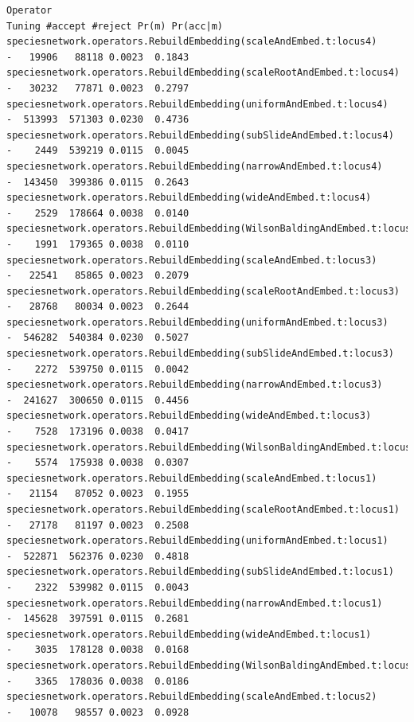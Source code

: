 \documentclass[11pt]{article}
\begin{document}
{\begin{verbatim}
Operator                                                                   Tuning #accept #reject Pr(m) Pr(acc|m)
speciesnetwork.operators.RebuildEmbedding(scaleAndEmbed.t:locus4)               -   19906   88118 0.0023  0.1843 
speciesnetwork.operators.RebuildEmbedding(scaleRootAndEmbed.t:locus4)           -   30232   77871 0.0023  0.2797 
speciesnetwork.operators.RebuildEmbedding(uniformAndEmbed.t:locus4)             -  513993  571303 0.0230  0.4736 
speciesnetwork.operators.RebuildEmbedding(subSlideAndEmbed.t:locus4)            -    2449  539219 0.0115  0.0045 
speciesnetwork.operators.RebuildEmbedding(narrowAndEmbed.t:locus4)              -  143450  399386 0.0115  0.2643 
speciesnetwork.operators.RebuildEmbedding(wideAndEmbed.t:locus4)                -    2529  178664 0.0038  0.0140 
speciesnetwork.operators.RebuildEmbedding(WilsonBaldingAndEmbed.t:locus4)       -    1991  179365 0.0038  0.0110 
speciesnetwork.operators.RebuildEmbedding(scaleAndEmbed.t:locus3)               -   22541   85865 0.0023  0.2079 
speciesnetwork.operators.RebuildEmbedding(scaleRootAndEmbed.t:locus3)           -   28768   80034 0.0023  0.2644 
speciesnetwork.operators.RebuildEmbedding(uniformAndEmbed.t:locus3)             -  546282  540384 0.0230  0.5027 
speciesnetwork.operators.RebuildEmbedding(subSlideAndEmbed.t:locus3)            -    2272  539750 0.0115  0.0042 
speciesnetwork.operators.RebuildEmbedding(narrowAndEmbed.t:locus3)              -  241627  300650 0.0115  0.4456 
speciesnetwork.operators.RebuildEmbedding(wideAndEmbed.t:locus3)                -    7528  173196 0.0038  0.0417 
speciesnetwork.operators.RebuildEmbedding(WilsonBaldingAndEmbed.t:locus3)       -    5574  175938 0.0038  0.0307 
speciesnetwork.operators.RebuildEmbedding(scaleAndEmbed.t:locus1)               -   21154   87052 0.0023  0.1955 
speciesnetwork.operators.RebuildEmbedding(scaleRootAndEmbed.t:locus1)           -   27178   81197 0.0023  0.2508 
speciesnetwork.operators.RebuildEmbedding(uniformAndEmbed.t:locus1)             -  522871  562376 0.0230  0.4818 
speciesnetwork.operators.RebuildEmbedding(subSlideAndEmbed.t:locus1)            -    2322  539982 0.0115  0.0043 
speciesnetwork.operators.RebuildEmbedding(narrowAndEmbed.t:locus1)              -  145628  397591 0.0115  0.2681 
speciesnetwork.operators.RebuildEmbedding(wideAndEmbed.t:locus1)                -    3035  178128 0.0038  0.0168 
speciesnetwork.operators.RebuildEmbedding(WilsonBaldingAndEmbed.t:locus1)       -    3365  178036 0.0038  0.0186 
speciesnetwork.operators.RebuildEmbedding(scaleAndEmbed.t:locus2)               -   10078   98557 0.0023  0.0928 

\end{verbatim}}
\end{document}
